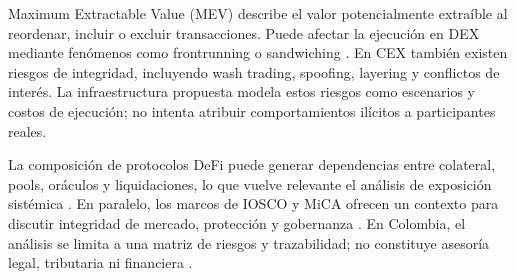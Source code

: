 Maximum Extractable Value (MEV) describe el valor potencialmente extraíble al reordenar, incluir o excluir transacciones. Puede afectar la ejecución en DEX mediante fenómenos como frontrunning o sandwiching \cite{materwala2024mev}. En CEX también existen riesgos de integridad, incluyendo wash trading, spoofing, layering y conflictos de interés. La infraestructura propuesta modela estos riesgos como escenarios y costos de ejecución; no intenta atribuir comportamientos ilícitos a participantes reales.

La composición de protocolos DeFi puede generar dependencias entre colateral, pools, oráculos y liquidaciones, lo que vuelve relevante el análisis de exposición sistémica \cite{capponi2023defi}. En paralelo, los marcos de IOSCO y MiCA ofrecen un contexto para discutir integridad de mercado, protección y gobernanza \cite{iosco2023crypto,iosco2023defi,esma2025mica}. En Colombia, el análisis se limita a una matriz de riesgos y trazabilidad; no constituye asesoría legal, tributaria ni financiera \cite{banrep2018criptoactivos}.
